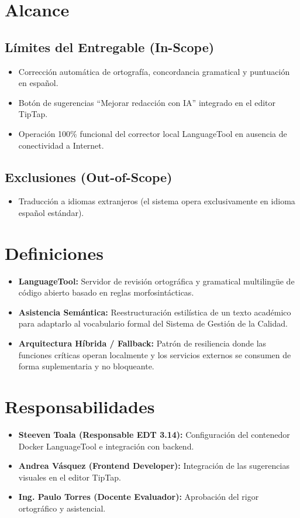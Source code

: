 \documentclass[12pt,a4paper]{article}
\begin{document}
\section{Alcance}
\subsection{Límites del Entregable (In-Scope)}
\begin{itemize}[leftmargin=1.5em, itemsep=2pt]
    \item Corrección automática de ortografía, concordancia gramatical y puntuación en español.
    \item Botón de sugerencias ``Mejorar redacción con IA'' integrado en el editor TipTap.
    \item Operación 100\% funcional del corrector local LanguageTool en ausencia de conectividad a Internet.
\end{itemize}
\subsection{Exclusiones (Out-of-Scope)}
\begin{itemize}[leftmargin=1.5em, itemsep=2pt]
    \item Traducción a idiomas extranjeros (el sistema opera exclusivamente en idioma español estándar).
\end{itemize}

\section{Definiciones}
\begin{itemize}[leftmargin=1.5em, itemsep=2pt]
    \item \textbf{LanguageTool:} Servidor de revisión ortográfica y gramatical multilingüe de código abierto basado en reglas morfosintácticas.
    \item \textbf{Asistencia Semántica:} Reestructuración estilística de un texto académico para adaptarlo al vocabulario formal del Sistema de Gestión de la Calidad.
    \item \textbf{Arquitectura Híbrida / Fallback:} Patrón de resiliencia donde las funciones críticas operan localmente y los servicios externos se consumen de forma suplementaria y no bloqueante.
\end{itemize}

\section{Responsabilidades}
\begin{itemize}[leftmargin=1.5em, itemsep=2pt]
    \item \textbf{Steeven Toala (Responsable EDT 3.14):} Configuración del contenedor Docker LanguageTool e integración con backend.
    \item \textbf{Andrea Vásquez (Frontend Developer):} Integración de las sugerencias visuales en el editor TipTap.
    \item \textbf{Ing. Paulo Torres (Docente Evaluador):} Aprobación del rigor ortográfico y asistencial.
\end{itemize}
\end{document}
